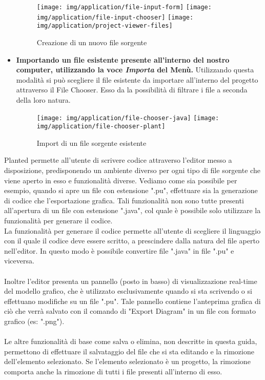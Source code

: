 \documentclass{article}
\begin{document}
\begin{appendices}
\begin{itemize}
      \begin{figure}[H]
        \centering
        \begin{framed}
          \texttt{[image: img/application/file-input-form]}
          \texttt{[image: img/application/file-input-chooser]}
          \texttt{[image: img/application/project-viewer-files]}
        \end{framed}
        \caption{Creazione di un nuovo file sorgente}
      \end{figure}
      \item \textbf{Importando un file esistente presente all'interno del nostro computer, utilizzando la voce \textit{Importa} del Menù.} Utilizzando questa modalità
      si può scegliere il file esistente da importare all'interno del progetto attraverso il File Chooser. Esso da la possibilità di filtrare i file a seconda
      della loro natura.
      \begin{figure}[H]
        \centering
        \begin{framed}
          \texttt{[image: img/application/file-chooser-java]}
          \texttt{[image: img/application/file-chooser-plant]}
        \end{framed}
        \caption{Import di un file sorgente esistente}
      \end{figure}
    \end{itemize}
    Planted permette all'utente di scrivere codice attraverso l'editor messo a disposizione, predisponendo un ambiente diverso per ogni tipo di file sorgente
    che viene aperto in esso e funzionalità diverse.
    Vediamo come sia possibile per esempio, quando si apre un file con estensione ".pu", effettuare sia la generazione di codice che l'esportazione grafica.
    Tali funzionalità non sono tutte presenti all'apertura di un file con estensione ".java", col quale è possibile solo utilizzare la funzionalità per generare
    il codice.\\La funzionalità per generare il codice permette all'utente di scegliere il linguaggio con il quale il codice deve essere scritto, a prescindere
    dalla natura del file aperto nell'editor. In questo modo è possibile convertire file ".java" in file ".pu" e viceversa.\\
    \\Inoltre l'editor presenta un pannello (posto in basso) di visualizzazione real-time del modello grafico, che è utilizzato esclusivamente quando si
    sta scrivendo o si effettuano modifiche su un file ".pu". Tale pannello contiene l'anteprima grafica di ciò che verrà salvato con il comando di "Export Diagram"
    in un file con formato grafico (es: ".png").\\
    \\Le altre funzionalità di base come salva o elimina, non descritte in questa guida, permettono di effettuare il salvataggio del file che si sta editando
    e la rimozione dell'elemento selezionato. Se l'elemento selezionato è un progetto, la rimozione comporta anche la rimozione di tutti i file presenti
    all'interno di esso.
  \end{appendices}
\end{document}
